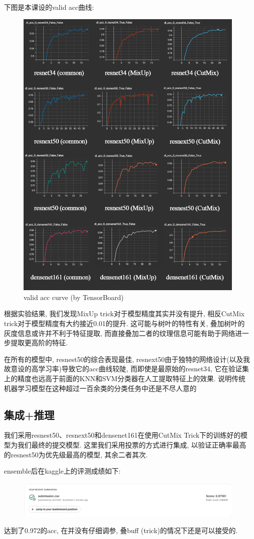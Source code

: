 \documentclass[lang=cn,12pt,a4paper]{elegantpaper}
\begin{document}
下图是本课设的valid acc曲线:

\begin{figure}[p]
    \centering
    \includegraphics[width=\textwidth]{lateximgs/5.png}
    \caption{valid acc curve (by TensorBoard)}
\end{figure}

\newpage
根据实验结果, 我们发现MixUp trick对于模型精度其实并没有提升, 相反CutMix trick对于模型精度有大约接近0.01的提升. 这可能与树叶的特性有关, 叠加树叶的灰度信息或许并不利于特征提取, 而直接叠加二者的纹理信息可能有助于网络进一步提取更高阶的特征.

在所有的模型中, resnest50的综合表现最佳, resnext50由于独特的网络设计(以及我故意设的高学习率)导致它的acc曲线较陡, 而即使是最原始的resnet34, 它在验证集上的精度也远高于前面的KNN和SVM分类器在人工提取特征上的效果. 说明传统机器学习模型在这种超过一百余类的分类任务中还是不尽人意的

\subsection{集成+推理}
我们采用resnest50、resnext50和densenet161在使用CutMix Trick下的训练好的模型为我们最终的提交模型. 这里我们采用投票的方式进行集成, 以验证正确率最高的resnest50为优先级最高的模型, 其余二者其次.

ensemble后在kaggle上的评测成绩如下:
\begin{figure}[h]
    \centering
    \includegraphics[width=\textwidth]{lateximgs/6.png}
    
\end{figure}

达到了0.972的acc, 在并没有仔细调参, 叠buff (trick)的情况下还是可以接受的.

% 

\end{document}
